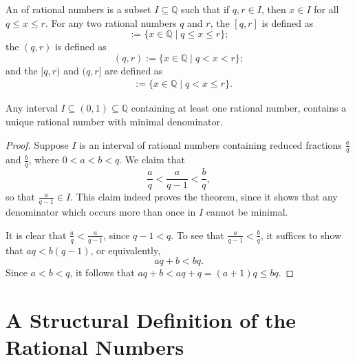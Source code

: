 \begin{definition}
  An  of rational numbers is a subset $I\subseteq \mathbb{Q}$ such that if $q,r\in I$, then $x\in I$ for all $q\leq x\leq r$. For any two rational numbers $q$ and $r$, the  $[q,r]$ is defined as
  \begin{equation*}
    [q,r]:=\{x\in \mathbb{Q}\mid q\leq x\leq r\};
  \end{equation*}
  the  $(q,r)$ is defined as
  \begin{equation*}
    (q,r):=\{x\in \mathbb{Q}\mid q<x<r\};
  \end{equation*}
  and the  $[q,r)$ and $(q,r]$ are defined as
  \begin{align*}
    [q,r) & := \{x\in\mathbb{Q}\mid q\leq x <r\}, \\
    (q,r] & := \{x\in\mathbb{Q}\mid q<x \leq r\}.
  \end{align*}
\end{definition}

\begin{theorem}
  Any interval $I\subseteq (0,1)\subseteq \mathbb{Q}$ containing at least one rational number, contains a unique rational number with minimal denominator.
\end{theorem}

\begin{proof}
  Suppose $I$ is an interval of rational numbers containing reduced fractions $\tfrac{a}{q}$ and $\tfrac{b}{q}$, where $0<a<b<q$. We claim that
  \begin{equation*}
    \frac{a}{q}<\frac{a}{q-1}<\frac{b}{q},
  \end{equation*}
  so that $\tfrac{a}{q-1}\in I$. This claim indeed proves the theorem, since it shows that any denominator which occurs more than once in $I$ cannot be minimal.

  It is clear that $\tfrac{a}{q}<\frac{a}{q-1}$, since $q-1<q$. To see that $\tfrac{a}{q-1}<\tfrac{b}{q}$, it suffices to show that $aq<b(q-1)$, or equivalently,
  \begin{equation*}
    aq+b<bq.
  \end{equation*}
  Since $a<b<q$, it follows that $aq+b<aq+q=(a+1)q\leq bq$.
\end{proof}

\section{A Structural Definition of the Rational Numbers}


